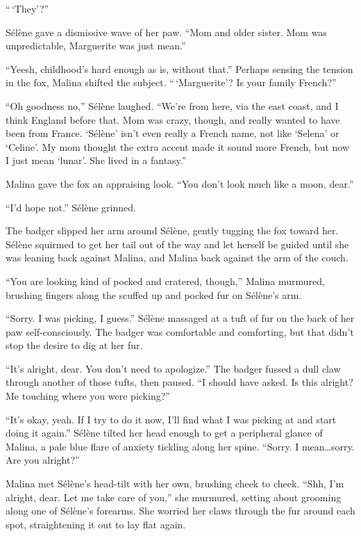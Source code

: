 ``\,`They'?''

Sélène gave a dismissive wave of her paw. ``Mom and older sister. Mom was unpredictable, Marguerite was just mean.''

``Yeesh, childhood's hard enough as is, without that.'' Perhaps sensing the tension in the fox, Malina shifted the subject. ``\,`Marguerite'? Is your family French?''

``Oh goodness no,'' Sélène laughed. ``We're from here, via the east coast, and I think England before that. Mom was crazy, though, and really wanted to have been from France. `Sélène' isn't even really a French name, not like `Selena' or `Celine'. My mom thought the extra accent made it sound more French, but now I just mean `lunar'. She lived in a fantasy.''

Malina gave the fox an appraising look. ``You don't look much like a moon, dear.''

``I'd hope not.'' Sélène grinned.

The badger slipped her arm around Sélène, gently tugging the fox toward her. Sélène squirmed to get her tail out of the way and let herself be guided until she was leaning back against Malina, and Malina back against the arm of the couch.

``You are looking kind of pocked and cratered, though,'' Malina murmured, brushing fingers along the scuffed up and pocked fur on Sélène's arm.

``Sorry. I was picking, I guess.'' Sélène massaged at a tuft of fur on the back of her paw self-consciously. The badger was comfortable and comforting, but that didn't stop the desire to dig at her fur.

``It's alright, dear. You don't need to apologize.'' The badger fussed a dull claw through another of those tufts, then paused. ``I should have asked. Is this alright? Me touching where you were picking?''

``It's okay, yeah. If I try to do it now, I'll find what I was picking at and start doing it again.'' Sélène tilted her head enough to get a peripheral glance of Malina, a pale blue flare of anxiety tickling along her spine. ``Sorry. I mean\ldots{}sorry. Are you alright?''

Malina met Sélène's head-tilt with her own, brushing cheek to cheek. ``Shh, I'm alright, dear. Let me take care of you,'' she murmured, setting about grooming along one of Sélène's forearms. She worried her claws through the fur around each spot, straightening it out to lay flat again.


